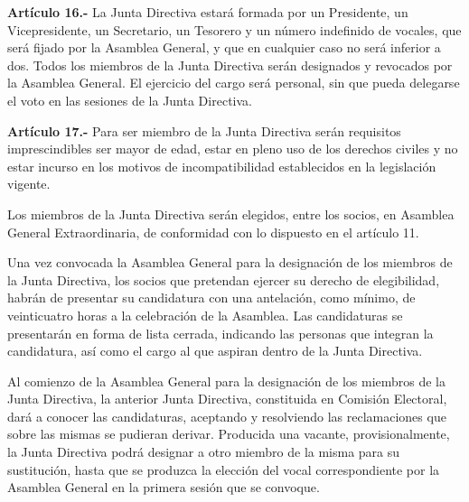 \documentclass[a4paper,12pt]{article}
\begin{document}
\begin{onehalfspace}
\bigskip\bigskip

\textbf{Art\'iculo 16.-} La Junta Directiva estar\'a formada por un Presidente, un Vicepresidente, un Secretario, un Tesorero y un n\'umero indefinido de vocales, que ser\'a fijado por la Asamblea General, y que en cualquier caso no ser\'a inferior a dos. Todos los miembros de la Junta Directiva ser\'an designados y revocados por la Asamblea General. El ejercicio del cargo ser\'a personal, sin que pueda delegarse el voto en las sesiones de la Junta Directiva.

\bigskip\bigskip

\textbf{Art\'iculo 17.-} Para ser miembro de la Junta Directiva ser\'an requisitos imprescindibles ser mayor de edad, estar en pleno uso de los derechos civiles y no estar incurso en los motivos de incompatibilidad establecidos en la legislaci\'on vigente.

Los miembros de la Junta Directiva ser\'an elegidos, entre los socios, en Asamblea General Extraordinaria, de conformidad con lo dispuesto en el art\'iculo 11.

Una vez convocada la Asamblea General para la designaci\'on de los miembros de la Junta Directiva, los socios que pretendan ejercer su derecho de elegibilidad, habr\'an de presentar su candidatura con una antelaci\'on, como m\'inimo, de veinticuatro horas a la celebraci\'on de la Asamblea. Las candidaturas se presentar\'an en forma de lista cerrada, indicando las personas que integran la candidatura, as\'i como el cargo al que aspiran dentro de la Junta Directiva.

Al comienzo de la Asamblea General para la designaci\'on de los miembros de la Junta Directiva, la anterior Junta Directiva, constituida en Comisi\'on Electoral, dar\'a a conocer las candidaturas, aceptando y resolviendo las reclamaciones que sobre las mismas se pudieran derivar. Producida una vacante, provisionalmente, la Junta Directiva podr\'a designar a otro miembro de la misma para su sustituci\'on, hasta que se produzca la elecci\'on del vocal correspondiente por la Asamblea General en la primera sesi\'on que se convoque.

\bigskip\bigskip


\end{onehalfspace}
\end{document}
